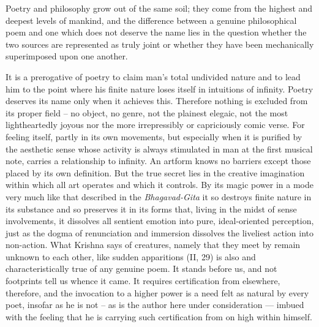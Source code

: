 \begin{quotationx}
Poetry and philosophy grow out of the same soil; they come from the highest and deepest levels of mankind, and the difference between a genuine philosophical poem and one which does not deserve the name lies in the question whether the two sources are represented as truly joint or whether they have been mechanically superimposed upon one another.

It is a prerogative of poetry to claim man's total undivided nature and to lead him to the point where his finite nature loses itself in intuitions of infinity. Poetry deserves its name only when it achieves this. Therefore nothing is excluded from its proper field -- no object, no genre, not the plainest elegaic, not the most lightheartedly joyous nor the more irrepressibly or capriciously comic verse. For feeling itself, partly in its own movements, but especially when it is purified by the aesthetic sense whose activity is always stimulated in man at the first musical note, carries a relationship to infinity. An artform knows no barriers except those placed by its own definition. But the true secret lies in the creative imagination within which all art operates and which it controls. By its magic power in a mode very much like that described in the \emph{Bhagavad-Gita} it so destroys finite nature in its substance and so preserves it in its forms that, living in the midst of sense involvements, it dissolves all sentient emotion into pure, ideal-oriented perception, just as the dogma of renunciation and immersion dissolves the liveliest action into non-action. What Krishna says of creatures, namely that they meet by remain unknown to each other, like sudden apparitions (II, 29) is also and characteristically true of any genuine poem. It stands before us, and not footprints tell us whence it came. It requires certification from elsewhere, therefore, and the invocation to a higher power is a need felt as natural by every poet, insofar as he is not -- as is the author here under consideration --- imbued with the feeling that he is carrying such certification from on high within himself.


\end{quotationx}
